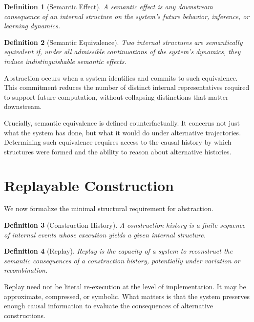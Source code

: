 \documentclass[11pt]{article}
\newtheorem{definition}{Definition}[section]
\begin{document}
\begin{definition}[Semantic Effect]
A semantic effect is any downstream consequence of an internal structure on the system's future behavior, inference, or learning dynamics.
\end{definition}

\begin{definition}[Semantic Equivalence]
Two internal structures are semantically equivalent if, under all admissible continuations of the system's dynamics, they induce indistinguishable semantic effects.
\end{definition}

Abstraction occurs when a system identifies and commits to such equivalence. This commitment reduces the number of distinct internal representatives required to support future computation, without collapsing distinctions that matter downstream.

Crucially, semantic equivalence is defined counterfactually. It concerns not just what the system has done, but what it would do under alternative trajectories. Determining such equivalence requires access to the causal history by which structures were formed and the ability to reason about alternative histories.

\section{Replayable Construction}

We now formalize the minimal structural requirement for abstraction.

\begin{definition}[Construction History]
A construction history is a finite sequence of internal events whose execution yields a given internal structure.
\end{definition}

\begin{definition}[Replay]
Replay is the capacity of a system to reconstruct the semantic consequences of a construction history, potentially under variation or recombination.
\end{definition}

Replay need not be literal re-execution at the level of implementation. It may be approximate, compressed, or symbolic. What matters is that the system preserves enough causal information to evaluate the consequences of alternative constructions.
\end{document}
